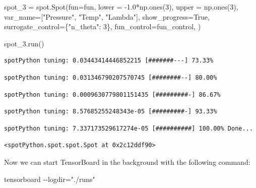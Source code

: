 \documentclass[
  letterpaper,
  DIV=11,
  numbers=noendperiod]{scrreprt}
\newenvironment{Shaded}{\begin{snugshade}}{\end{snugshade}}
\newcommand{\DecValTok}[1]{\textcolor[rgb]{0.68,0.00,0.00}{#1}}
\newcommand{\FloatTok}[1]{\textcolor[rgb]{0.68,0.00,0.00}{#1}}
\newcommand{\NormalTok}[1]{\textcolor[rgb]{0.00,0.23,0.31}{#1}}
\newcommand{\OperatorTok}[1]{\textcolor[rgb]{0.37,0.37,0.37}{#1}}
\newcommand{\StringTok}[1]{\textcolor[rgb]{0.13,0.47,0.30}{#1}}
\newcommand{\VariableTok}[1]{\textcolor[rgb]{0.07,0.07,0.07}{#1}}
\begin{document}
\begin{Shaded}
\begin{Highlighting}[]
\NormalTok{spot\_3 }\OperatorTok{=}\NormalTok{ spot.Spot(fun}\OperatorTok{=}\NormalTok{fun,}
\NormalTok{                   lower }\OperatorTok{=} \OperatorTok{{-}}\FloatTok{1.0}\OperatorTok{*}\NormalTok{np.ones(}\DecValTok{3}\NormalTok{),}
\NormalTok{                   upper }\OperatorTok{=}\NormalTok{ np.ones(}\DecValTok{3}\NormalTok{),}
\NormalTok{                   var\_name}\OperatorTok{=}\NormalTok{[}\StringTok{"Pressure"}\NormalTok{, }\StringTok{"Temp"}\NormalTok{, }\StringTok{"Lambda"}\NormalTok{],}
\NormalTok{                   show\_progress}\OperatorTok{=}\VariableTok{True}\NormalTok{,}
\NormalTok{                   surrogate\_control}\OperatorTok{=}\NormalTok{\{}\StringTok{"n\_theta"}\NormalTok{: }\DecValTok{3}\NormalTok{\},}
\NormalTok{                   fun\_control}\OperatorTok{=}\NormalTok{fun\_control,}
\NormalTok{              )}

\NormalTok{spot\_3.run()}
\end{Highlighting}
\end{Shaded}

\begin{verbatim}
spotPython tuning: 0.03443414446852215 [#######---] 73.33% 
\end{verbatim}

\begin{verbatim}
spotPython tuning: 0.031346790207570745 [########--] 80.00% 
\end{verbatim}

\begin{verbatim}
spotPython tuning: 0.0009630779801151435 [#########-] 86.67% 
\end{verbatim}

\begin{verbatim}
spotPython tuning: 8.57685255248343e-05 [#########-] 93.33% 
\end{verbatim}

\begin{verbatim}
spotPython tuning: 7.337173529617274e-05 [##########] 100.00% Done...
\end{verbatim}

\begin{verbatim}
<spotPython.spot.spot.Spot at 0x2c12ddf90>
\end{verbatim}

Now we can start TensorBoard in the background with the following
command:

\begin{Shaded}
\begin{Highlighting}[]
\NormalTok{tensorboard {-}{-}logdir="./runs"}
\end{Highlighting}
\end{Shaded}
\end{document}
